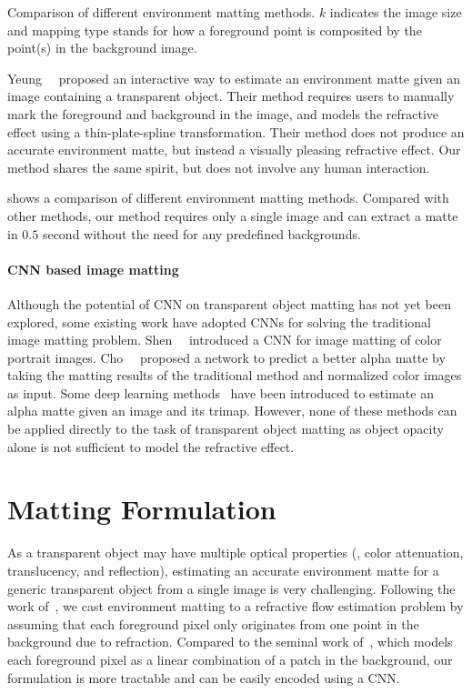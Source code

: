 \begin{table}
    \caption[Comparison of different environment matting methods]{Comparison of different environment matting methods. $k$ indicates the image size and mapping type stands for how a foreground point is composited by the point(s) in the background image.}
    \label{tab:related_work}
    
\end{table}

Yeung~\etal~\cite{yeung2011matting} proposed an interactive way to estimate an environment matte given an image containing a transparent object. Their method requires users to manually mark the foreground and background in the image, and models the refractive effect using a thin-plate-spline transformation. Their method does not produce an accurate environment matte, but instead a visually pleasing refractive effect. Our method shares the same spirit, but does not involve any human interaction. 

 shows a comparison of different environment matting methods. Compared with other methods, our method requires only a single image and can extract a matte in $0.5$ second without the need for any predefined backgrounds.

\paragraph{CNN based image matting}
Although the potential of CNN on transparent object matting has not yet been explored, some existing work have adopted CNNs for solving the traditional image matting problem. Shen~\etal~\cite{shen2016deep} introduced a CNN for image matting of color portrait images. Cho~\etal~\cite{cho2016natural} proposed a network to predict a better alpha matte by taking the matting results of the traditional method and normalized color images as input. 
Some deep learning methods~\cite{xu2017deep,zhang2019late,lu2019indices} have been introduced to estimate an alpha matte given an image and its trimap. 
However, none of these methods can be applied directly to the task of transparent object matting as object opacity alone is not sufficient to model the refractive effect. 

\section{Matting Formulation}
\label{sec:formulation}
As a transparent object may have multiple optical properties (\eg, color attenuation, translucency, and reflection), estimating an accurate environment matte for a generic transparent object from a single image is very challenging. 
Following the work of~\cite{chuang2000environment}, we cast environment matting to a refractive flow estimation problem by assuming that each foreground pixel only originates from one point in the background due to refraction. Compared to the seminal work of~\cite{zongker1999environment}, which models each foreground pixel as a linear combination of a patch in the background, our formulation is more tractable and can be easily encoded using a CNN.

